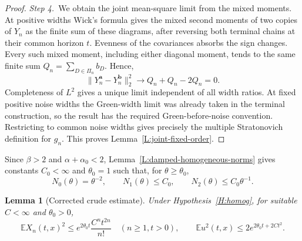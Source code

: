 \documentclass[12pt,oneside,openany]{book}
\makeatletter
\let\lean@pending\@empty
\newcommand{\LeanMarker}[1]{\gdef\lean@pending{#1}}
\numberwithin{equation}{section}
\newtheorem{lemma}[theorem]{Lemma}
\theoremstyle{nogostyle}
\theoremstyle{definition}
\newcommand{\E}{\mathbb{E}}
\makeatother
\begin{document}
\begin{proof}
  \medskip
  \noindent\textit{Step 4.~}We obtain the joint mean-square limit from the
  mixed moments.
  At positive widths Wick's formula gives the mixed second moments of two copies
  of $Y_n$ as the finite sum of these diagrams, after reversing both terminal
  chains at their common horizon $t$. Evenness of the covariances absorbs the
  sign changes. Every such mixed moment, including either diagonal moment, tends
  to the same finite sum $Q_n = \sum_{D\in\Pi_n}b_D$. Hence,
  \[
    \|Y_n^{\boldsymbol a}-Y_n^{\boldsymbol b}\|_2^2
    \longrightarrow Q_n+Q_n-2Q_n=0.
  \]
  Completeness of $L^2$ gives a unique limit independent of all width ratios. At
  fixed positive noise widths the Green-width limit was already taken in the
  terminal construction, so the result has the required Green-before-noise
  convention. Restricting to common noise widths gives precisely the multiple
  Stratonovich definition for $g_n$. This proves
  Lemma~\ref{L:joint-fixed-order}.
\end{proof}



Since $\beta > 2$ and $\alpha+\alpha_0 < 2$,
Lemma~\ref{L:damped-homogeneous-norms} gives constants $C_0 < \infty$ and
$\theta_0 = 1$ such that, for $\theta \ge \theta_0$,
\begin{equation}\label{E:crude-norms}
  N_0(\theta)=\theta^{-2},\qquad
  N_1(\theta)\le C_0,\qquad N_2(\theta)\le C_0\theta^{-1}.
\end{equation}
\LeanMarker{L:crude-corrected}%
\begin{lemma}[Corrected crude estimate]\label{L:crude-corrected}
  Under Hypothesis~\ref{H:homog}, for suitable $C < \infty$ and $\theta_0 > 0$,
  \begin{equation}\label{E:crude-corrected}
    \E X_n(t,x)^2\le e^{2\theta_0t}\frac{C^nt^{2n}}{n!}
    \quad(n\ge1,t>0),\qquad
    \E u^2(t,x)\le2e^{2\theta_0t+2Ct^2}.
  \end{equation}
\end{lemma}
\end{document}
